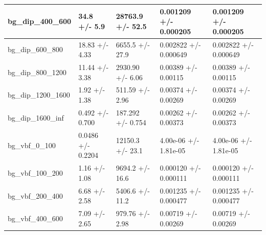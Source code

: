 \documentclass[a4paper, 10pt]{article}
\begin{document}
\begin{table}[H]
\begin{center}
\begin{tabular}{|m{20.0mm}|m{27.0mm}|m{27.0mm}|m{33.0mm}|m{32.0mm}|}
      \hline
      {\cellcolor{white}         bg\_dip\_400\_600}& {\cellcolor{white}         34.8 +/\-- 5.9}& {\cellcolor{white}         28763.9 +/\-- 52.5}& {\cellcolor{white}         0.001209 +/\-- 0.000205}& {\cellcolor{white}         0.001209 +/\-- 0.000205}\\
      \hline
      {\cellcolor{white}         bg\_dip\_600\_800}& {\cellcolor{white}         18.83 +/\-- 4.33}& {\cellcolor{white}         6655.5 +/\-- 27.9}& {\cellcolor{white}         0.002822 +/\-- 0.000649}& {\cellcolor{white}         0.002822 +/\-- 0.000649}\\
      \hline
      {\cellcolor{white}         bg\_dip\_800\_1200}& {\cellcolor{white}         11.44 +/\-- 3.38}& {\cellcolor{white}         2930.90 +/\-- 6.06}& {\cellcolor{white}         0.00389 +/\-- 0.00115}& {\cellcolor{white}         0.00389 +/\-- 0.00115}\\
      \hline
      {\cellcolor{white}         bg\_dip\_1200\_1600}& {\cellcolor{white}         1.92 +/\-- 1.38}& {\cellcolor{white}         511.59 +/\-- 2.96}& {\cellcolor{white}         0.00374 +/\-- 0.00269}& {\cellcolor{white}         0.00374 +/\-- 0.00269}\\
      \hline
      {\cellcolor{white}         bg\_dip\_1600\_inf}& {\cellcolor{white}         0.492 +/\-- 0.700}& {\cellcolor{white}         187.292 +/\-- 0.754}& {\cellcolor{white}         0.00262 +/\-- 0.00373}& {\cellcolor{white}         0.00262 +/\-- 0.00373}\\
      \hline
      {\cellcolor{white}         bg\_vbf\_0\_100}& {\cellcolor{white}         0.0486 +/\-- 0.2204}& {\cellcolor{white}         12150.3 +/\-- 23.1}& {\cellcolor{white}         4.00e-06 +/\-- 1.81e-05}& {\cellcolor{white}         4.00e-06 +/\-- 1.81e-05}\\
      \hline
      {\cellcolor{white}         bg\_vbf\_100\_200}& {\cellcolor{white}         1.16 +/\-- 1.08}& {\cellcolor{white}         9694.2 +/\-- 16.6}& {\cellcolor{white}         0.000120 +/\-- 0.000111}& {\cellcolor{white}         0.000120 +/\-- 0.000111}\\
      \hline
      {\cellcolor{white}         bg\_vbf\_200\_400}& {\cellcolor{white}         6.68 +/\-- 2.58}& {\cellcolor{white}         5406.6 +/\-- 11.2}& {\cellcolor{white}         0.001235 +/\-- 0.000477}& {\cellcolor{white}         0.001235 +/\-- 0.000477}\\
      \hline
      {\cellcolor{white}         bg\_vbf\_400\_600}& {\cellcolor{white}         7.09 +/\-- 2.65}& {\cellcolor{white}         979.76 +/\-- 2.98}& {\cellcolor{white}         0.00719 +/\-- 0.00269}& {\cellcolor{white}         0.00719 +/\-- 0.00269}\\

\end{tabular}
\end{center}
\end{table}
\end{document}

